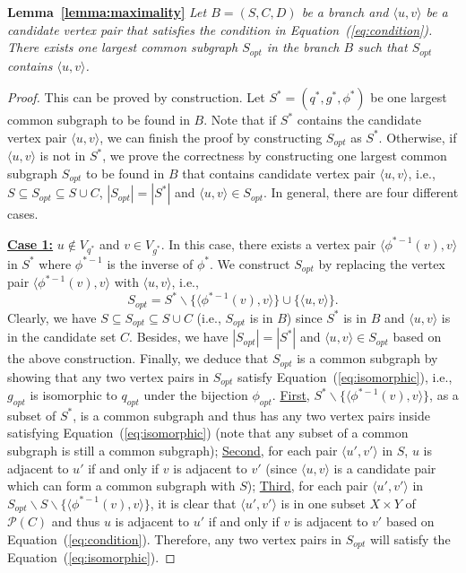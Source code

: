 \smallskip
\noindent\textbf{Lemma~\ref{lemma:maximality}} \emph{Let $B=(S,C,D)$ be a branch {\chengC and $\langle u,v \rangle$ be a candidate vertex pair that satisfies the condition in Equation~(\ref{eq:condition}).} There exists one largest common subgraph $S_{opt}$ in the branch $B$ such that $S_{opt}$ contains 
    {\chengC $\langle u,v \rangle$.}}
\begin{proof}
    This can be proved by construction. Let $S^*=(q^*,g^*,\phi^*)$ be one largest common subgraph to be found in $B$. Note that if $S^*$ contains the candidate vertex pair $\langle u,v \rangle$, we can finish the proof by constructing $S_{opt}$ as $S^*$. Otherwise, if $\langle u,v \rangle$ is not in $S^*$, we prove the correctness by constructing one largest common subgraph $S_{opt}$ to be found in $B$ that contains candidate vertex pair $\langle u,v \rangle$, i.e., $S\subseteq S_{opt} \subseteq S\cup C$,  $|S_{opt}|=|S^*|$ and $\langle u,v \rangle\in S_{opt}$.
    In general, there are four different cases.

    \smallskip
    \noindent\underline{\textbf{Case 1:}} $u\notin V_{q^*}$ and $v\in V_{g^*}$. In this case, there exists a vertex pair $\langle\phi^{*-1}(v),v \rangle$ in $S^*$ where $\phi^{*-1}$ is the inverse of $\phi^*$. We construct $S_{opt}$ by replacing the vertex pair $\langle\phi^{*-1}(v),v \rangle$ with $\langle u,v \rangle$, i.e.,
    \begin{equation}
        S_{opt}=S^*\backslash\{ \langle\phi^{*-1}(v),v \rangle\} \cup \{\langle u,v \rangle\}.
    \end{equation}
    Clearly, we have $S\subseteq S_{opt}\subseteq S\cup C$ (i.e., $S_{opt}$ is in $B$) since $S^*$ is in $B$ and $\langle u,v\rangle$ is in the candidate set $C$. Besides, we have $|S_{opt}|=|S^*|$ and $\langle u,v \rangle\in S_{opt}$ based on the above construction. Finally, we deduce that $S_{opt}$ is a common subgraph by showing that any two vertex pairs in $S_{opt}$ satisfy Equation~(\ref{eq:isomorphic}), i.e., $g_{opt}$ is isomorphic to $q_{opt}$ under the bijection $\phi_{opt}$. \underline{First}, $S^*\backslash\{\langle \phi^{*-1}(v),v\rangle\}$, as a subset of $S^*$, is a common subgraph and thus has any two vertex pairs inside satisfying Equation~(\ref{eq:isomorphic}) (note that any subset of a common subgraph is still a common subgraph); \underline{Second}, for each pair $\langle u',v' \rangle$ in $S$, $u$ is adjacent to $u'$ if and only if $v$ is adjacent to $v'$ (since $\langle u,v \rangle$ is a candidate pair which can form a common subgraph with $S$); \underline{Third}, for each pair $\langle u',v' \rangle$ in $S_{opt}\backslash S\backslash\{\langle \phi^{*-1}(v),v\rangle\}$, it is clear that $\langle u',v' \rangle$ is in one subset $ X\times Y$ of $\mathcal{P}(C)$ and thus $u$ is adjacent to $u'$ if and only if $v$ is adjacent to $v'$ based on Equation~(\ref{eq:condition}). Therefore, any two vertex pairs in $S_{opt}$ will satisfy the Equation~(\ref{eq:isomorphic}).


\end{proof}
